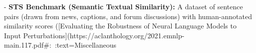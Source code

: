 - \textbf{STS Benchmark (Semantic Textual Similarity):} A dataset of sentence pairs (drawn from news, captions, and forum discussions) with human-annotated similarity scores ([Evaluating the Robustness of Neural Language Models to Input Perturbations](https://aclanthology.org/2021.emnlp-main.117.pdf#:~:text=Miscellaneous%

